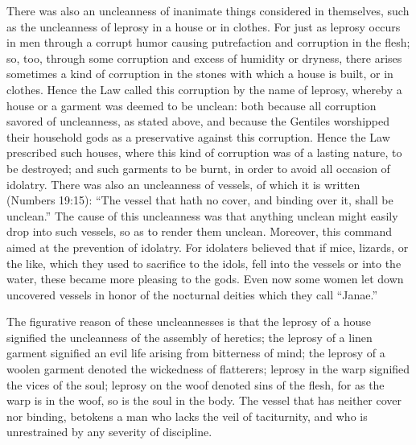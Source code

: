 There was also an uncleanness of inanimate things considered in themselves, such as the uncleanness of leprosy in a house or in clothes. For just as leprosy occurs in men through a corrupt humor causing putrefaction and corruption in the flesh; so, too, through some corruption and excess of humidity or dryness, there arises sometimes a kind of corruption in the stones with which a house is built, or in clothes. Hence the Law called this corruption by the name of leprosy, whereby a house or a garment was deemed to be unclean: both because all corruption savored of uncleanness, as stated above, and because the Gentiles worshipped their household gods as a preservative against this corruption. Hence the Law prescribed such houses, where this kind of corruption was of a lasting nature, to be destroyed; and such garments to be burnt, in order to avoid all occasion of idolatry. There was also an uncleanness of vessels, of which it is written (Numbers 19:15): ``The vessel that hath no cover, and binding over it, shall be unclean.'' The cause of this uncleanness was that anything unclean might easily drop into such vessels, so as to render them unclean. Moreover, this command aimed at the prevention of idolatry. For idolaters believed that if mice, lizards, or the like, which they used to sacrifice to the idols, fell into the vessels or into the water, these became more pleasing to the gods. Even now some women let down uncovered vessels in honor of the nocturnal deities which they call ``Janae.''

The figurative reason of these uncleannesses is that the leprosy of a house signified the uncleanness of the assembly of heretics; the leprosy of a linen garment signified an evil life arising from bitterness of mind; the leprosy of a woolen garment denoted the wickedness of flatterers; leprosy in the warp signified the vices of the soul; leprosy on the woof denoted sins of the flesh, for as the warp is in the woof, so is the soul in the body. The vessel that has neither cover nor binding, betokens a man who lacks the veil of taciturnity, and who is unrestrained by any severity of discipline.


